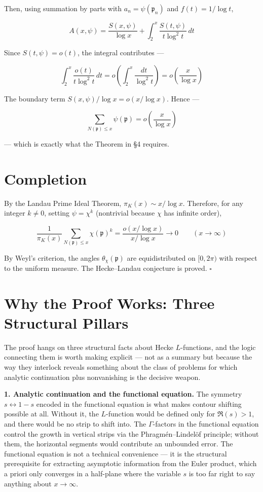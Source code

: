 \documentclass[12pt,a4paper]{article}
\newcommand{\pilcrow}{\S}
\begin{document}
Then, using summation by parts with $a_n = \psi(\mathfrak{p}_n)$ and $f(t) = 1/\log t$,

\[
A(x, \psi) = \frac{S(x, \psi)}{\log x} + \int_2^x \frac{S(t, \psi)}{t \log^2 t} \, dt
\]

Since $S(t, \psi) = o(t)$, the integral contributes ---

\[
\int_2^x \frac{o(t)}{t \log^2 t} \, dt = o\!\left(\int_2^x \frac{dt}{\log^2 t}\right) = o\!\left(\frac{x}{\log x}\right)
\]

The boundary term $S(x, \psi)/\log x = o(x/\log x)$. Hence ---

\[
\sum_{N(\mathfrak{p}) \leq x} \psi(\mathfrak{p}) = o\!\left(\frac{x}{\log x}\right)
\]

--- which is exactly what the Theorem in \pilcrow{}4 requires.

\section{Completion}

By the Landau Prime Ideal Theorem, $\pi_K(x) \sim x/\log x$. Therefore, for any integer $k \neq 0$, setting $\psi = \chi^k$ (nontrivial because $\chi$ has infinite order),

\[
\frac{1}{\pi_K(x)} \sum_{N(\mathfrak{p}) \leq x} \chi(\mathfrak{p})^k = \frac{o(x/\log x)}{x/\log x} \to 0 \qquad (x \to \infty)
\]

By Weyl's criterion, the angles $\theta_{\chi}(\mathfrak{p})$ are equidistributed on $[0, 2\pi)$ with respect to the uniform measure. The Hecke--Landau conjecture is proved. $\square$

\section{Why the Proof Works: Three Structural Pillars}

The proof hangs on three structural facts about Hecke $L$-functions, and the logic connecting them is worth making explicit --- not as a summary but because the way they interlock reveals something about the class of problems for which analytic continuation plus nonvanishing is the decisive weapon.

\textbf{1. Analytic continuation and the functional equation.} The symmetry $s \leftrightarrow 1-s$ encoded in the functional equation is what makes contour shifting possible at all. Without it, the $L$-function would be defined only for $\Re(s) > 1$, and there would be no strip to shift into. The $\Gamma$-factors in the functional equation control the growth in vertical strips via the Phragmén--Lindelöf principle; without them, the horizontal segments would contribute an unbounded error. The functional equation is not a technical convenience --- it is the structural prerequisite for extracting asymptotic information from the Euler product, which a priori only converges in a half-plane where the variable $s$ is too far right to say anything about $x \to \infty$.
\end{document}
